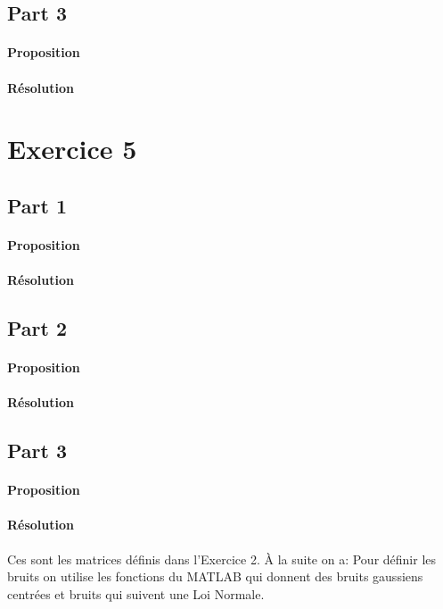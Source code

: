 \documentclass{article}
\begin{document}
\subsection{Part 3}
\paragraph{Proposition}

\paragraph{Résolution}



\section{Exercice 5}
\subsection{Part 1}
\paragraph{Proposition}

\paragraph{Résolution}


\subsection{Part 2}
\paragraph{Proposition}

\paragraph{Résolution}


\subsection{Part 3}
\paragraph{Proposition}

\paragraph{Résolution}



Ces sont les matrices définis dans l'Exercice 2. \cite{cellMATLAB} À la suite on a:
Pour définir les bruits on utilise les fonctions du MATLAB \cite{awgnMATLAB} \cite{wgnMATLAB} \cite{randnMATLAB} qui donnent des bruits gaussiens centrées et bruits qui suivent une Loi Normale. \cite{bruitBlancMATLAB} \cite{bruitBlancMATLABrand} \cite{bruitBlancMATLABwgn}\\



\end{document}
